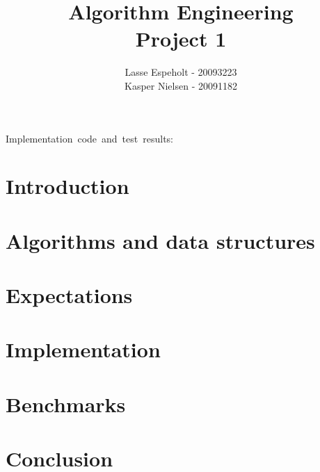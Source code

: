 \documentclass[a4paper]{article}
\begin{document}
\title{Algorithm Engineering\\Project 1}


\author{Lasse Espeholt - 20093223\\
Kasper Nielsen - 20091182}

\maketitle
\vfill{}

\begin{description}
\item [{Implementation~code~and~test~results:}] %
\end{description}
\pagebreak{}\tableofcontents{}\pagebreak{}


\section{Introduction}


	
\section{Algorithms and data structures}



\section{Expectations}



\section{Implementation}



\section{Benchmarks}



\section{Conclusion}


\end{document}

